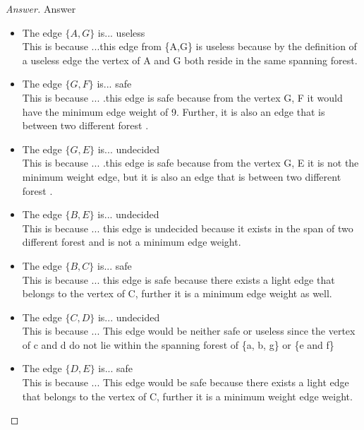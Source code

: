 \documentclass[11pt]{article}
\theoremstyle{definition}
\theoremstyle{definition}
\theoremstyle{definition}
\begin{document}
\begin{proof}[Answer] Answer\\
\begin{itemize} 
\item The edge $\{A,G\}$ is... useless \\%
This is because ...this edge from \{A,G\} is useless because by the definition of a useless edge the vertex of A and G both reside in the same spanning forest.
\item The edge $\{G,F\}$ is... safe\\%
This is because ... .this edge is safe because from the vertex {G, F} it would have the minimum edge weight of 9. Further, it is also an edge that is between two different forest . %
\item The edge $\{G,E\}$ is... undecided\\%
This is because ... .this edge is safe because from the vertex {G, E} it is not the minimum weight edge, but it is also an edge that is between two different forest .
\item The edge $\{B,E\}$ is... undecided\\%
This is because ... this edge is undecided because it exists in the span of two different forest and  is not a minimum edge weight.%
\item The edge $\{B,C\}$ is... safe \\%
This is because ... this edge is safe because there exists a light edge that belongs to the vertex of C, further it is a minimum edge weight as well.%
\item The edge $\{C,D\}$ is... undecided \\%
This is because ... This edge would be neither safe or useless since the vertex of c and d do not lie within the spanning forest of \{a, b, g\} or \{e and f\}
\item The edge $\{D,E\}$ is... safe\\%
This is because ... This edge would be safe because there exists a light edge that belongs to the vertex of C, further it is a minimum weight edge weight. %
\end{itemize}
\end{proof}


\newpage
\end{document}
